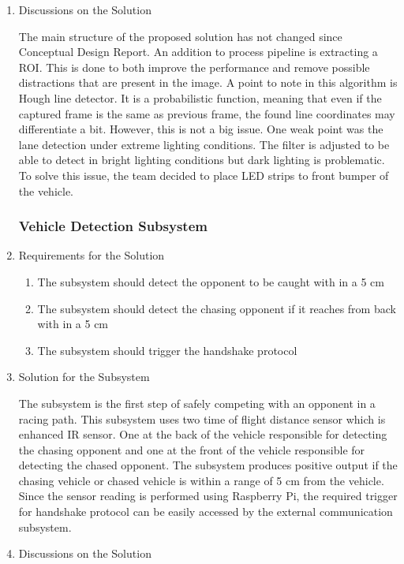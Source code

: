 \documentclass[a4paper,12pt]{article}
\begin{document}
\begin{enumerate}
			
			\item {Discussions on the Solution}
			
			The main structure of the proposed solution has not changed since Conceptual Design Report. An addition to process pipeline is extracting a ROI. This is done to both improve the performance and remove possible distractions that are present in the image. A point to note in this algorithm is Hough line detector. It is a probabilistic function, meaning that even if the captured frame is the same as previous frame, the found line coordinates may differentiate a bit. However, this is not a big issue. One weak point was the lane detection under extreme lighting conditions. The filter is adjusted to be able to detect in bright lighting conditions but dark lighting is problematic. To solve this issue, the team decided to place LED strips to front bumper of the vehicle.
	
	\subsubsection{Vehicle Detection Subsystem}
	
		
	\item {Requirements for the Solution}
			
			\begin{enumerate}
				\item The subsystem should detect the opponent to be caught with in a 5 cm 
				\item The subsystem should detect the chasing opponent if it reaches from back with in a 5 cm 
				\item The subsystem should trigger the handshake protocol 
			\end{enumerate}
			
			\item {Solution for the Subsystem}
			
			The subsystem is the first step of safely competing with an opponent in a racing path. This subsystem uses two time of flight distance sensor which is enhanced IR sensor. One at the back of the vehicle responsible for detecting the chasing opponent and one at the front of the vehicle responsible for detecting the chased opponent. The subsystem produces positive output if the chasing vehicle or chased vehicle is within a range of 5 cm from the vehicle. Since the sensor reading is performed using Raspberry Pi, the required trigger for handshake protocol can be easily accessed by the external communication subsystem.
			
			
\item {Discussions on the Solution}
			
			
		\end{enumerate}
	
\end{document}
